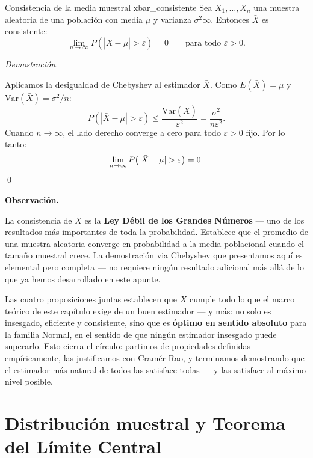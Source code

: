 \documentclass[12pt, a4paper]{book}
\newenvironment{observacion}{%
    \par\medskip\noindent\textbf{\color{azul}Observaci\'{o}n.}\enspace\itshape
}{\par\medskip}
\renewenvironment{proof}{%
    \par\medskip\noindent\textit{Demostraci\'{o}n.}\enspace
}{\qed\par\medskip}
\numberwithin{equation}{chapter}
\begin{document}
\begin{proposicion}{Consistencia de la media muestral}
	{xbar_consistente}
	Sea $X_1, \ldots, X_n$ una muestra aleatoria de una
	poblaci\'{o}n con media $\mu$ y varianza $\sigma^2 
	\infty$. Entonces $\bar{X}$ es consistente:
	\[
	\lim_{n\to\infty} P\!\left(|\bar{X} - \mu| >
	\varepsilon\right) = 0
	\qquad \text{para todo } \varepsilon > 0.
	\]
\end{proposicion}

\begin{proof}
	Aplicamos la desigualdad de Chebyshev al estimador
	$\bar{X}$. Como $E(\bar{X}) = \mu$ y
	$\mathrm{Var}(\bar{X}) = \sigma^2/n$:
	\[
	P\!\left(|\bar{X} - \mu| > \varepsilon\right)
	\leq \frac{\mathrm{Var}(\bar{X})}{\varepsilon^2}
	= \frac{\sigma^2}{n\varepsilon^2}.
	\]
	Cuando $n \to \infty$, el lado derecho converge a
	cero para todo $\varepsilon > 0$ fijo. Por lo tanto:
	\[
	\lim_{n\to\infty} P\!\left(|\bar{X} - \mu| >
	\varepsilon\right) = 0. \qedhere
	\]
\end{proof}

\begin{observacion}
	La consistencia de $\bar{X}$ es la \textbf{Ley D\'{e}bil
		de los Grandes N\'{u}meros} --- uno de los resultados
	m\'{a}s importantes de toda la probabilidad. Establece
	que el promedio de una muestra aleatoria converge en
	probabilidad a la media poblacional cuando el tama\~{n}o
	muestral crece. La demostraci\'{o}n via Chebyshev que
	presentamos aqu\'{i} es elemental pero completa ---
	no requiere ning\'{u}n resultado adicional m\'{a}s all\'{a}
	de lo que ya hemos desarrollado en este apunte.
\end{observacion}

Las cuatro proposiciones juntas establecen que $\bar{X}$
cumple todo lo que el marco te\'{o}rico de este cap\'{i}tulo
exige de un buen estimador --- y m\'{a}s: no solo es
insesgado, eficiente y consistente, sino que es
\textbf{\'{o}ptimo en sentido absoluto} para la familia
Normal, en el sentido de que ningún estimador insesgado
puede superarlo. Esto cierra el c\'{i}rculo: partimos de
propiedades definidas emp\'{i}ricamente, las justificamos
con Cram\'{e}r-Rao, y terminamos demostrando que el
estimador m\'{a}s natural de todos las satisface todas
--- y las satisface al m\'{a}ximo nivel posible.

\section{Distribuci\'{o}n muestral y Teorema del
	L\'{i}mite Central}
\end{document}
